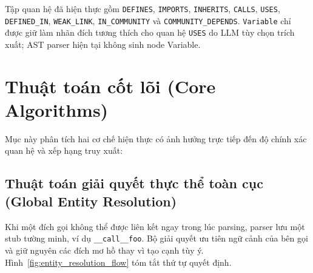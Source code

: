 \documentclass[12pt,a4paper,oneside]{report}
\begin{document}
Tập quan hệ đã hiện thực gồm \texttt{DEFINES}, \texttt{IMPORTS}, \texttt{INHERITS}, \texttt{CALLS}, \texttt{USES}, \texttt{DEFINED\_IN}, \texttt{WEAK\_LINK}, \texttt{IN\_COMMUNITY} và \texttt{COMMUNITY\_DEPENDS}. \texttt{Variable} chỉ được giữ làm nhãn đích tương thích cho quan hệ \texttt{USES} do LLM tùy chọn trích xuất; AST parser hiện tại không sinh node Variable.

\section{Thuật toán cốt lõi (Core Algorithms)}
Mục này phân tích hai cơ chế hiện thực có ảnh hưởng trực tiếp đến độ chính xác quan hệ và xếp hạng truy xuất:

\subsection{Thuật toán giải quyết thực thể toàn cục (Global Entity Resolution)}
\label{sec:entity_resolution}
Khi một đích gọi không thể được liên kết ngay trong lúc parsing, parser lưu một stub tường minh, ví dụ \texttt{\_\_call\_\_foo}. Bộ giải quyết ưu tiên ngữ cảnh của bên gọi và giữ nguyên các đích mơ hồ thay vì tạo cạnh tùy ý. Hình~\ref{fig:entity_resolution_flow} tóm tắt thứ tự quyết định.
\end{document}
